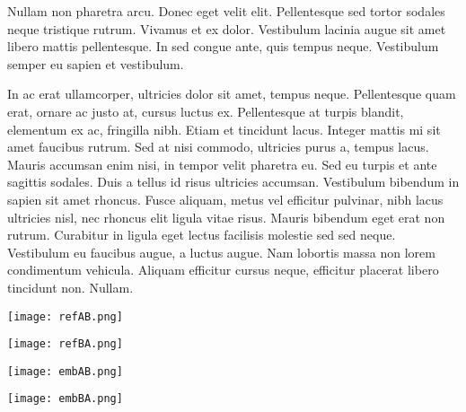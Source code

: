 Nullam non pharetra arcu. Donec eget velit elit. Pellentesque sed tortor sodales neque tristique rutrum. Vivamus et ex dolor. Vestibulum lacinia augue sit amet libero mattis pellentesque. In sed congue ante, quis tempus neque. Vestibulum semper eu sapien et vestibulum.

In ac erat ullamcorper, ultricies dolor sit amet, tempus neque. Pellentesque quam erat, ornare ac justo at, cursus luctus ex. Pellentesque at turpis blandit, elementum ex ac, fringilla nibh. Etiam et tincidunt lacus. Integer mattis mi sit amet faucibus rutrum. Sed at nisi commodo, ultricies purus a, tempus lacus. Mauris accumsan enim nisi, in tempor velit pharetra eu. Sed eu turpis et ante sagittis sodales. Duis a tellus id risus ultricies accumsan. Vestibulum bibendum in sapien sit amet rhoncus. Fusce aliquam, metus vel efficitur pulvinar, nibh lacus ultricies nisl, nec rhoncus elit ligula vitae risus. Mauris bibendum eget erat non rutrum. Curabitur in ligula eget lectus facilisis molestie sed sed neque. Vestibulum eu faucibus augue, a luctus augue. Nam lobortis massa non lorem condimentum vehicula. Aliquam efficitur cursus neque, efficitur placerat libero tincidunt non. Nullam.

\begin{center}
    \texttt{[image: refAB.png]}
\end{center}

\begin{center}
    \texttt{[image: refBA.png]}
\end{center}

\begin{center}
    \texttt{[image: embAB.png]}
\end{center}

\begin{center}
    \texttt{[image: embBA.png]}
\end{center}
